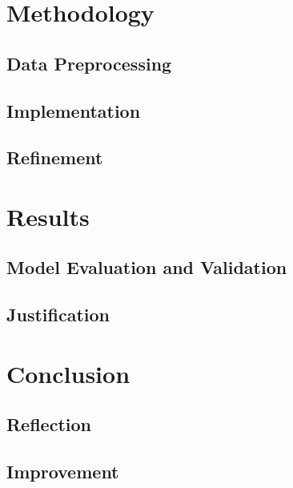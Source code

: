 \documentclass[a4paper,12pt,nottoc]{article}
\begin{document}
\section{Methodology}

\subsection{Data Preprocessing}

\subsection{Implementation}

\subsection{Refinement}

\section{Results}

\subsection{Model Evaluation and Validation}

\subsection{Justification}

\section{Conclusion}

\subsection{Reflection}

\subsection{Improvement}
\end{document}
